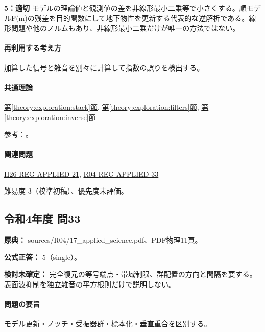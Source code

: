 \noindent\textbf{5：適切} モデルの理論値と観測値の差を非線形最小二乗等で小さくする。順モデルF(m)の残差を目的関数にして地下物性を更新する代表的な逆解析である。線形問題や他のノルムもあり、非線形最小二乗だけが唯一の方法ではない。\par

\paragraph{再利用する考え方} 加算した信号と雑音を別々に計算して指数の誤りを検出する。

\paragraph{共通理論} \hyperref[theory:exploration:stack]{第\ref*{theory:exploration:stack}節}, \hyperref[theory:exploration:filters]{第\ref*{theory:exploration:filters}節}, \hyperref[theory:exploration:inverse]{第\ref*{theory:exploration:inverse}節}

\par 参考：\cite{mit_signals2010,mit_moving2012,scipy_notch,scipy_fft,usgs_processing2000,pygimli_inversion}。

\paragraph{関連問題} \hyperref[q:h26-reg-applied-21]{H26-REG-APPLIED-21}, \hyperref[q:r04-reg-applied-33]{R04-REG-APPLIED-33}

\par 難易度 3（校準初稿）、優先度未評価。

\subsection{令和4年度 問33}
\label{q:r04-reg-applied-33}

\noindent\textbf{原典：} sources/R04/17\_applied\_science.pdf、PDF物理11頁。

\textbf{公式正答：} 5（single）。

\par\textbf{検討未確定：} 完全復元の等号端点・帯域制限、群配置の方向と間隔を要する。表面波抑制を独立雑音の平方根則だけで説明しない。

\paragraph{問題の要旨} モデル更新・ノッチ・受振器群・標本化・垂直重合を区別する。

